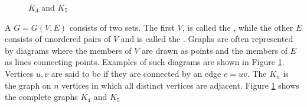 \begin{figure}[h]
  \centering
  
  \caption{$K_{4}$ and $K_{5}$}
  \label{fig:complete}
\end{figure}

A  $G = G(V, E)$ consists of two sets.
The first $V$, is called the , while the other $E$ consists of unordered pairs of $V$ and is called the .
Graphs are often represented by diagrams where the members of $V$ are drawn as points and the members of $E$ as lines connecting points.
Examples of such diagrams are shown in Figure \ref{fig:complete}.
Vertices $u, v$ are said to be  if they are connected by an edge $e = uv$.
The  $K_n$ is the graph on $n$ vertices in which all distinct vertices are adjacent.
Figure \ref{fig:complete} shows the complete graphs $K_{4}$ and $K_{5}$
